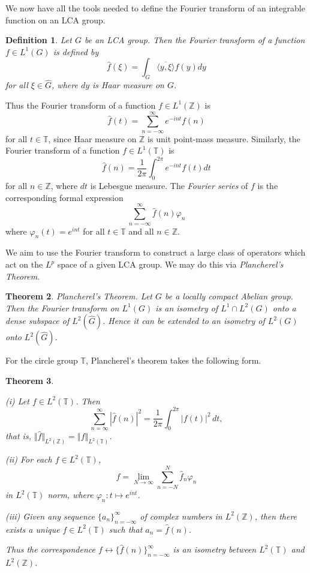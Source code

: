 \documentclass[honours,12pt]{unswthesis}
\newcommand{\T}{\mathbb{T}}
\newcommand{\Z}{\mathbb{Z}}
\newcommand{\hatt}[1]{\widehat #1}
\def\ip<#1,#2>{\langle #1,#2 \rangle}
\def\norm#1{\left \Vert #1 \right \Vert}
\def\ssnorm#1{\Vert #1 \Vert}
\newtheorem{theorem}{Theorem}[section]
\newtheorem{definition}[theorem]{Definition}
\numberwithin{equation}{section}
\begin{document}
We now have all the tools needed to define the Fourier transform of an 
integrable
function on an LCA group.

\begin{definition}\label{Fourier transf}
Let $G$ be an LCA group. Then the {\em
Fourier transform} of a function $f\in L^1(G)$ is defined by
\[\hatt{f}(\xi) = \int_G \overline{\ip<y,\xi>}f(y)dy\]
for all $\xi\in\hatt{G}$, where $dy$ is Haar measure on $G$.
\end{definition}

Thus the Fourier transform of a function $f\in L^1(\Z)$ is
\[\hatt{f}(t)=\sum_{n=-\infty}^{\infty}e^{-int}f(n)\]
for all $t\in\T$, since Haar measure on $\Z$ is unit point-mass measure.
Similarly, the Fourier transform of a function $f\in L^1(\T)$ is
\[\hatt{f}(n) = \frac{1}{2\pi}\int_0^{2\pi}e^{-int}f(t)dt\]
for all $n\in\Z$, where $dt$ is Lebesgue measure. The {\em Fourier series} of
$f$ is the corresponding formal expression
\[\sum_{n=-\infty}^{\infty}\hatt{f}(n)\varphi_n\]
where $\varphi_n(t)=e^{int}$ for all $t\in\T$ and all $n\in\Z$.


We aim to use the Fourier transform to construct a large class of operators
which act on the $L^p$ space of a given LCA group. We may do this via {\em
Plancherel's Theorem}.

\begin{theorem}\label{isometry}\cite[Chapter VII, \S 4]{Katznelson}
{\em Plancherel's Theorem.} Let $G$ be a locally compact Abelian group. Then the
Fourier transform on $L^1(G)$ is an isometry of $L^1\cap L^2(G)$ onto a dense
subspace of $L^2(\hatt{G})$. Hence it can be extended to an isometry of $L^2(G)$
onto $L^2(\hatt{G})$.
\end{theorem}

For the circle group $\T$, Plancherel's theorem takes the following form.

\begin{theorem}\label{Plancherel for T}\cite[Theorem I.5.5]{Katznelson}

(i) Let $f\in L^2(\T)$. Then
\[\sum_{n=\infty}^{\infty}|\hatt{f}(n)|^2=
\frac{1}{2\pi}\int_0^{2\pi}|f(t)|^2\,dt,\]
that is, $\ssnorm{\hatt{f}}_{L^2(\Z)}=\norm{f}_{L^2(\T)}$.

(ii) For each $f\in L^2(\T)$,
\[f=\lim_{N\rightarrow\infty}\sum_{n=-N}^N\hatt{f}_n\varphi_n\]
in $L^2(\T)$ norm, where $\varphi_n:t\mapsto e^{int}$.

(iii) Given any sequence $\{a_n\}_{n=-\infty}^{\infty}$ of complex numbers in
$L^2(\Z)$, then there exists a unique $f\in L^2(\T)$ such that
$a_n=\hatt{f}(n)$.

Thus the correspondence $f\leftrightarrow\{\hatt{f}(n)\}_{n=-\infty}^{\infty}$
is an isometry between $L^2(\T)$ and $L^2(\Z)$.
\end{theorem}
\end{document}
